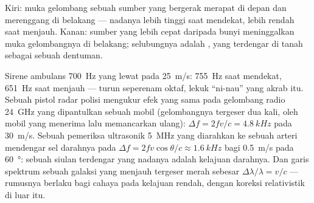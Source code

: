 \begin{omfigure}

{\small Kiri: muka gelombang sebuah sumber yang bergerak merapat di depan dan merenggang
di belakang --- nadanya lebih tinggi saat mendekat, lebih rendah saat menjauh. Kanan: sumber
yang lebih cepat daripada bunyi meninggalkan muka gelombangnya di belakang; selubungnya adalah
, yang terdengar di tanah sebagai sebuah dentuman.}
\end{omfigure}

\begin{example}\label{ex:b2:sound-waves:dopplerex}
Sirene ambulans \qty{700}{Hz} yang lewat pada \qty{25}{m/s}: \qty{755}{Hz}
saat mendekat, \qty{651}{Hz} saat menjauh --- turun seperenam oktaf,
lekuk ``ni-nau'' yang akrab itu. Sebuah pistol radar polisi mengukur efek
yang sama pada gelombang radio \qty{24}{GHz} yang dipantulkan sebuah mobil (gelombangnya
tergeser dua kali, oleh mobil yang menerima lalu memancarkan ulang): $\Delta f = 2fv/c =
\qty{4.8}{kHz}$ pada \qty{30}{m/s}. Sebuah pemeriksa ultrasonik \qty{5}{MHz} yang diarahkan ke
sebuah arteri mendengar sel darahnya pada $\Delta f = 2fv\cos\theta/c \approx \qty{1.6}{kHz}$
bagi \qty{0.5}{m/s} pada \qty{60}{\degree}: sebuah siulan terdengar yang nadanya adalah
kelajuan darahnya. Dan garis spektrum sebuah galaksi yang menjauh tergeser
merah sebesar $\Delta\lambda/\lambda = v/c$ --- rumusnya berlaku bagi cahaya pada kelajuan rendah,
dengan koreksi relativistik di luar itu.
\end{example}

